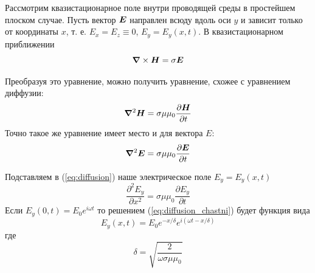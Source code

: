 \documentclass[12pt, a4paper]{article}
\begin{document}
Рассмотрим квазистационарное поле внутри проводящей среды в простейшем плоском случае.
Пусть вектор $\vb*{E}$ направлен всюду вдоль оси $y$ и зависит только от координаты $x$, т. е. ${E_x} = {E_z} \equiv 0$, $E_y=E_y(x,t)$.
В квазистационарном приближении
\begin{equation*}
  \grad \times \vb*{H} = \sigma \vb*{E}
\end{equation*}

Преобразуя это уравнение, можно получить уравнение, схожее с уравнением диффузии:
\begin{equation}
  \grad^2\vb*{H}=\sigma\mu\mu_0 \frac{\partial \vb*{H}}{\partial t}\label{eq:laplacian_H}
\end{equation}
Точно такое же уравнение имеет место и для вектора $E:$
\begin{equation}
  \grad^2\vb*{E}=\sigma\mu\mu_0 \frac{\partial \vb*{E}}{\partial t}\label{eq:diffusion}
\end{equation}

Подставляем в (\ref{eq:diffusion}) наше электрическое поле $E_y=E_y(x,t)$
\begin{equation}
  \frac{\partial^2 E_y}{\partial x^2} = \sigma\mu\mu_0\frac{\partial E_y}{\partial t}
  \label{eq:diffusion_chastni}
\end{equation}
Если $E_y(0,t)=E_0 e^{i\omega t}$ то решением (\ref{eq:diffusion_chastni}) будет функция вида
\begin{equation}
  E_y(x,t)=E_0 e^{-x/\delta} e^{i(\omega t - x/\delta)}
  \label{eq:skin_effect_poluprostranstvo}
\end{equation}
где
\begin{equation}
  \delta = \sqrt{\frac{2}{\omega\sigma\mu\mu_0}}
  \label{eq:delta}
\end{equation}

\newpage
\end{document}
